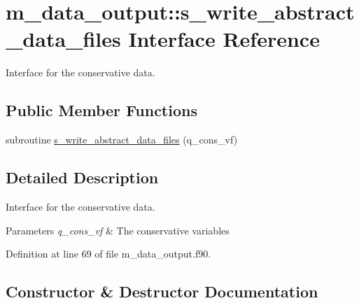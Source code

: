 \hypertarget{interfacem__data__output_1_1s__write__abstract__data__files}{}\section{m\+\_\+data\+\_\+output\+:\+:s\+\_\+write\+\_\+abstract\+\_\+data\+\_\+files Interface Reference}
\label{interfacem__data__output_1_1s__write__abstract__data__files}


Interface for the conservative data.  


\subsection*{Public Member Functions}
\begin{DoxyCompactItemize}
\item 
subroutine \hyperlink{interfacem__data__output_1_1s__write__abstract__data__files_ae1ed4cd5dd22a52d0d7e91a127452b80}{s\+\_\+write\+\_\+abstract\+\_\+data\+\_\+files} (q\+\_\+cons\+\_\+vf)
\end{DoxyCompactItemize}


\subsection{Detailed Description}
Interface for the conservative data. 


\begin{DoxyParams}{Parameters}
{\em q\+\_\+cons\+\_\+vf} & The conservative variables \\
\hline
\end{DoxyParams}


Definition at line 69 of file m\+\_\+data\+\_\+output.\+f90.



\subsection{Constructor \& Destructor Documentation}
\mbox{\label{interfacem__data__output_1_1s__write__abstract__data__files_ae1ed4cd5dd22a52d0d7e91a127452b80}} 
